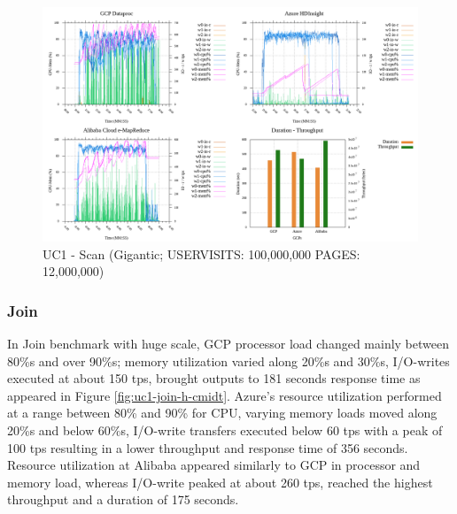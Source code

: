 \documentclass[review]{elsarticle}
\begin{document}
	\begin{figure}[p]
		\caption{UC1 - Scan (Gigantic; USERVISITS: 100,000,000 PAGES: 12,000,000)}
		\label{fig:uc1-scan-g-cmidt}
		\includegraphics[width=\textwidth]{uc1-scan-g-cmidt}
		\centering
	\end{figure}
	
	\subsubsection{Join}
	In Join benchmark with huge scale, GCP processor load changed mainly between 80\%s and over 90\%s; memory utilization varied along 20\%s and 30\%s, I/O-writes executed at about 150 tps, brought outputs to 181 seconds response time as appeared in Figure \ref{fig:uc1-join-h-cmidt}. Azure's resource utilization performed at a range between 80\% and 90\% for CPU, varying memory loads moved along 20\%s and below 60\%s, I/O-write transfers executed below 60 tps with a peak of 100 tps resulting in a lower throughput and response time of 356 seconds. Resource utilization at Alibaba appeared similarly to GCP in processor and memory load, whereas I/O-write peaked at about 260 tps, reached the highest throughput and a duration of 175 seconds.
	
\end{document}
